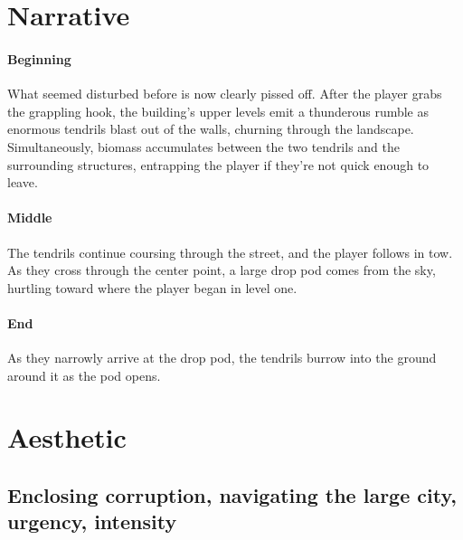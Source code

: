 \documentclass[letterpaper]{report}
\begin{document}
		\section{Narrative}
			\paragraph{Beginning} What seemed disturbed before is now clearly pissed off. After the player grabs the grappling hook, the building's upper levels emit a thunderous rumble as enormous tendrils blast out of the walls, churning through the landscape. Simultaneously, biomass accumulates between the two tendrils and the surrounding structures, entrapping the player if they're not quick enough to leave.
			\paragraph{Middle} The tendrils continue coursing through the street, and the player follows in tow. As they cross through the center point, a large drop pod comes from the sky, hurtling toward where the player began in level one.
			\paragraph{End} As they narrowly arrive at the drop pod, the tendrils burrow into the ground around it as the pod opens.
		\section{Aesthetic}
			\subsection{Enclosing corruption, navigating the large city, urgency, intensity}
\end{document}

